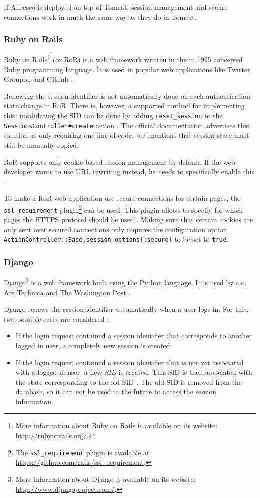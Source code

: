 If Alfresco is deployed on top of Tomcat, session management and secure connections work in much the same way as they do in Tomcat.

\subsubsection{Ruby on Rails}

Ruby on Rails\footnote{More information about Ruby on Rails is available on its website: \url{http://rubyonrails.org/}.} (or RoR) is a web framework written in the in 1995 conceived Ruby programming language. It is used in popular web applications like Twitter, Groupon and Github \cite{RailsApps}.

Renewing the session identifier is not automatically done on each authentication state change in RoR. There is, however, a supported method for implementing this: invalidating the SID can be done by adding \texttt{reset\_session} to the \texttt{SessionsController\#create} action \cite{Webers2008}. The official documentation advertises this solution as only requiring one line of code, but mentions that session state must still be manually copied.

RoR supports only cookie-based session management by default. If the web developer wants to use URL rewriting instead, he needs to specifically enable this \cite{McMahon2010}.

To make a RoR web application use secure connections for certain pages, the \texttt{ssl\_requirement} plugin\footnote{The \texttt{ssl\_requirement} plugin is available at \url{https://github.com/rails/ssl_requirement}.} can be used. This plugin allows to specify for which pages the HTTPS protocol should be used \cite{Slater2008}. Making sure that certain cookies are only sent over secured connections only requires the configuration option \texttt{ActionController::Base.session\_options[:secure]} to be set to \texttt{true}.

\subsubsection{Django}

Django\footnote{More information about Django is available on its website: \url{http://www.djangoproject.com/}.} is a web framework built using the Python language. It is used by a.o. Ars Technica and The Washington Post \cite{DjangoPoweredBy}.

Django renews the session identifier automatically when a user logs in. For this, two possible cases are considered \cite{DjangoLoginCode}:
\begin{itemize}
	\item If the login request contained a session identifier that corresponds to another logged in user, a completely new session is created.
	\item If the login request contained a session identifier that is not yet associated with a logged in user, a new \emph{SID} is created. This SID is then associated with the state corresponding to the old SID \cite{DjangoSessionsCode}. The old SID is removed from the database, so it can not be used in the future to access the session information.
\end{itemize}

